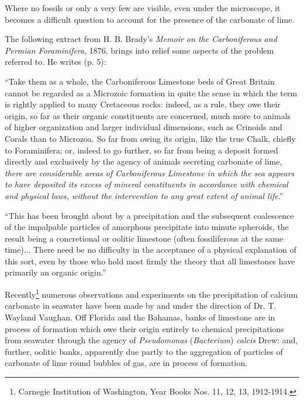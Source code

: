 \documentclass[a4paper, 12pt, oneside]{article}
\begin{document}
Where no fossils or only a very few are visible, even under the microscope, it becomes a difficult question to account for the presence of the carbonate of lime.

The following extract from H. B. Brady's \emph{Memoir on the Carboniferous and Permian Foraminifera}, 1876, brings into relief some aspects of the problem referred to. He writes (p. 5):

``Take them as a whole, the Carboniferous Limestone beds of Great Britain cannot be regarded as a Microzoic formation in quite the sense in which the term is rightly applied to many Cretaceous rocks: indeed, as a rule, they owe their origin, so far as their organic constituents are concerned, much more to animals of higher organization and larger individual dimensions, such as Crinoids and Corals than to Microzoa. So far from owing its origin, like the true Chalk, chiefly to Foraminifera; or, indeed to go further, so far from being a deposit formed directly and exclusively by the agency of animals secreting carbonate of lime, \emph{there are considerable areas of Carboniferous Limestone in which the sea appears to have deposited its excess of mineral constituents in accordance with chemical and physical laws, without the intervention to any great extent of animal life}.''

``This has been brought about by a precipitation and the subsequent coalescence of the impalpable particles of amorphous precipitate into minute spheroids, the result being a concretional or oolitic limestone (often fossiliferous at the same time)... There need be no difficulty in the acceptance of a physical explanation of this sort, even by those who hold most firmly the theory that all limestones have primarily an organic origin.''

Recently\footnote{Carnegie Institution of Washington, Year Books Nos. 11, 12, 13, 1912-1914.} numerous observations and experiments on the precipitation of calcium carbonate in seawater have been made by and under the direction of Dr. T. Wayland Vaughan. Off Florida and the Bahamas, banks of limestone are in process of formation which owe their origin entirely to chemical precipitations from seawater through the agency of \emph{Pseudomonas} (\emph{Bacterium}) \emph{calcis} Drew: and, further, oolitic banks, apparently due partly to the aggregation of particles of carbonate of lime round bubbles of gas, are in process of formation.
\end{document}
